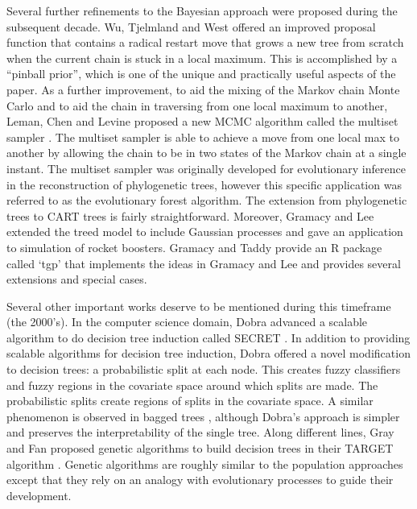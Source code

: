 Several further refinements to the Bayesian approach were proposed during the subsequent decade. Wu, Tjelmland and West \cite{wu2007bayesian} offered an improved proposal function that contains a radical restart move that grows a new tree from scratch when the current chain is stuck in a local maximum. This is accomplished by a ``pinball prior'', which is one of the unique and practically useful aspects of the paper. As a further improvement, to aid the mixing of the Markov chain Monte Carlo and to aid the chain in traversing from one local maximum to another, Leman, Chen and Levine proposed a new MCMC algorithm called the multiset sampler \cite{leman2009multiset}. The multiset sampler is able to achieve a move from one local max to another by allowing the chain to be in two states of the Markov chain at a single instant. The multiset sampler was originally developed for evolutionary inference in the reconstruction of phylogenetic trees, however this specific application was referred to as the evolutionary forest algorithm. The extension from phylogenetic trees to CART trees is fairly straightforward.  Moreover, Gramacy and Lee \cite{gramacy2008bayesian} extended the treed model to include Gaussian processes and gave an application to simulation of rocket boosters. Gramacy and Taddy \cite{gramacy2012categorical} provide an R package called `tgp' that implements the ideas in Gramacy and Lee \cite{gramacy2008bayesian} and provides several extensions and special cases. 

Several other important works deserve to be mentioned during this timeframe (the 2000's).  In the computer science domain, Dobra advanced a scalable algorithm to do decision tree induction called SECRET \cite{dobra2002secret}. In addition to providing scalable algorithms for decision tree induction, Dobra offered a novel modification to decision trees: a probabilistic split at each node. This creates fuzzy classifiers and fuzzy regions in the covariate space around which splits are made. The probabilistic splits create regions of splits in the covariate space. A similar phenomenon is observed in bagged trees \cite{breiman1996bagging}, although Dobra's approach is simpler and preserves the interpretability of the single tree. Along different lines, Gray and Fan proposed genetic algorithms to build decision trees in their TARGET algorithm \cite{gray2008classification}. Genetic algorithms are roughly similar to the population approaches \cite{cappe2004population} except that they rely on an analogy with evolutionary processes to guide their development.  

